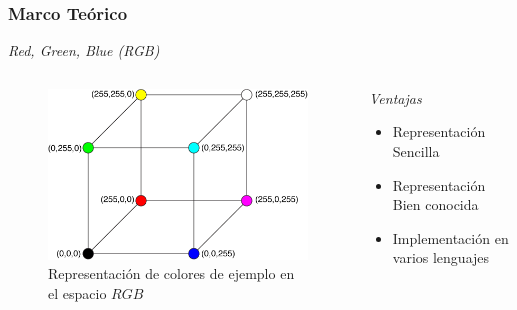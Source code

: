 \documentclass[usenames,dvipsnames]{beamer}
\begin{document}
\begin{frame} 
\frametitle{Marco Teórico} 
\begin{exampleblock}{\textit{Red, Green, Blue (RGB)}}
\end{exampleblock} 

\begin{columns}[onlytextwidth]
\begin{column}{.45\textwidth}
\begin{figure}
  \includegraphics[width=\textwidth]{graphics/RGBCube.png}
  \caption{Representación de colores de ejemplo en el espacio $RGB$}
\end{figure}
\end{column}
\hfill
\begin{column}{.45\textwidth}
                \begin{exampleblock}{\textit{Ventajas}}
				\end{exampleblock}
             	
				\begin{itemize}
					\item Representación Sencilla
					\item Representación Bien conocida
					\item Implementación en varios lenguajes
				\end{itemize}
\end{column}
\end{columns}


\end{frame}
\end{document}
